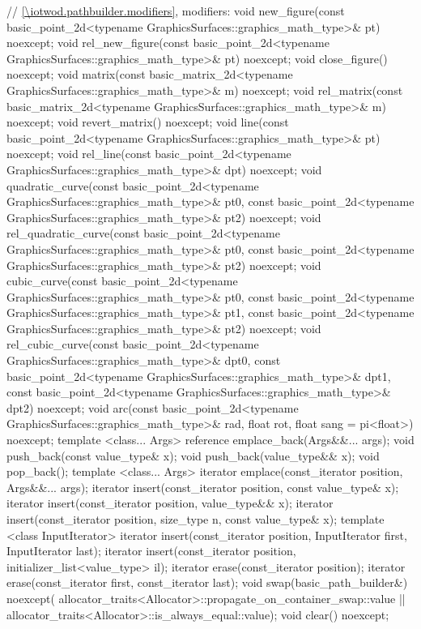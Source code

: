 \begin{codeblock}
{{    // \ref{\iotwod.pathbuilder.modifiers}, modifiers:
    void new_figure(const basic_point_2d<typename
      GraphicsSurfaces::graphics_math_type>& pt) noexcept;
    void rel_new_figure(const basic_point_2d<typename
      GraphicsSurfaces::graphics_math_type>& pt) noexcept;
    void close_figure() noexcept;
    void matrix(const basic_matrix_2d<typename
      GraphicsSurfaces::graphics_math_type>& m) noexcept;
    void rel_matrix(const basic_matrix_2d<typename
      GraphicsSurfaces::graphics_math_type>& m) noexcept;
    void revert_matrix() noexcept;
    void line(const basic_point_2d<typename GraphicsSurfaces::graphics_math_type>& pt) noexcept;
    void rel_line(const basic_point_2d<typename
      GraphicsSurfaces::graphics_math_type>& dpt) noexcept;
    void quadratic_curve(const basic_point_2d<typename
      GraphicsSurfaces::graphics_math_type>& pt0, const basic_point_2d<typename
      GraphicsSurfaces::graphics_math_type>& pt2) noexcept;
    void rel_quadratic_curve(const basic_point_2d<typename
      GraphicsSurfaces::graphics_math_type>& pt0, const basic_point_2d<typename
      GraphicsSurfaces::graphics_math_type>& pt2) noexcept;
    void cubic_curve(const basic_point_2d<typename
      GraphicsSurfaces::graphics_math_type>& pt0, const basic_point_2d<typename
      GraphicsSurfaces::graphics_math_type>& pt1, const basic_point_2d<typename
      GraphicsSurfaces::graphics_math_type>& pt2) noexcept;
    void rel_cubic_curve(const basic_point_2d<typename
      GraphicsSurfaces::graphics_math_type>& dpt0, const basic_point_2d<typename
      GraphicsSurfaces::graphics_math_type>& dpt1, const basic_point_2d<typename
      GraphicsSurfaces::graphics_math_type>& dpt2) noexcept;
    void arc(const basic_point_2d<typename
      GraphicsSurfaces::graphics_math_type>& rad, float rot, float sang = pi<float>) noexcept;
    template <class... Args>
    reference emplace_back(Args&&... args);
    void push_back(const value_type& x);
    void push_back(value_type&& x);
    void pop_back();
    template <class... Args>
    iterator emplace(const_iterator position, Args&&... args);
    iterator insert(const_iterator position, const value_type& x);
    iterator insert(const_iterator position, value_type&& x);
    iterator insert(const_iterator position, size_type n, const value_type& x);
    template <class InputIterator>
    iterator insert(const_iterator position, InputIterator first, InputIterator last);
    iterator insert(const_iterator position,
    initializer_list<value_type> il);
    iterator erase(const_iterator position);
    iterator erase(const_iterator first, const_iterator last);
    void swap(basic_path_builder&) noexcept(
      allocator_traits<Allocator>::propagate_on_container_swap::value ||
      allocator_traits<Allocator>::is_always_equal::value);
    void clear() noexcept;

}}
\end{codeblock}
